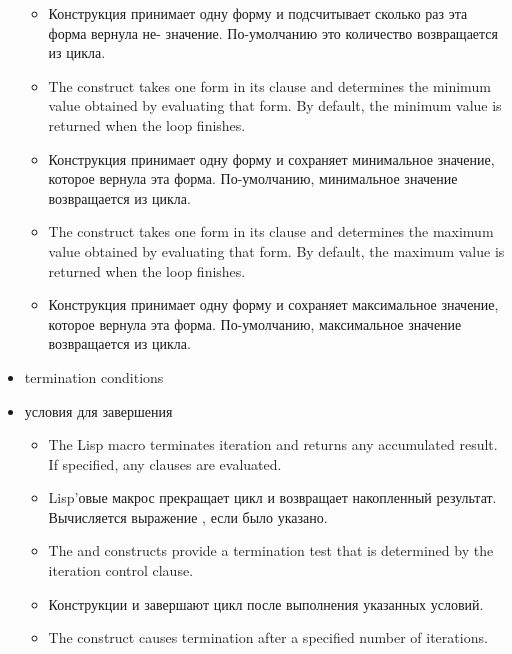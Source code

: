 \begin{itemize}
\begin{itemize}
  \item Конструкция  принимает одну форму и подсчитывает
    сколько раз эта форма вернула не- значение. По-умолчанию
    это количество возвращается из цикла.

  \item The  construct takes one form in its clause and
    determines the minimum value obtained by evaluating that form.  By
    default, the minimum value is returned when the loop finishes.

  \item Конструкция  принимает одну форму и сохраняет
    минимальное значение, которое вернула эта форма. По-умолчанию,
    минимальное значение возвращается из цикла.

  \item The  construct takes one form in its clause and
    determines the maximum value obtained by evaluating that form.  By
    default, the maximum value is returned when the loop finishes.

  \item Конструкция  принимает одну форму и сохраняет
    максимальное значение, которое вернула эта форма. По-умолчанию,
    максимальное значение возвращается из цикла.
  \end{itemize}

  \item termination conditions

  \item условия для завершения

  \begin{itemize}
  \item The  Lisp macro terminates iteration and
    returns any accumulated result.  If specified, any 
    clauses are evaluated.

  \item Lisp'овые макрос  прекращает цикл и
    возвращает накопленный результат. Вычисляется выражение
    , если было указано.

  \item The  and  constructs provide a termination
    test that is determined by the iteration control clause.

  \item Конструкции  и  завершают цикл после
    выполнения указанных условий.

  \item The  construct causes termination after a
    specified number of iterations.


\end{itemize}
\end{itemize}
